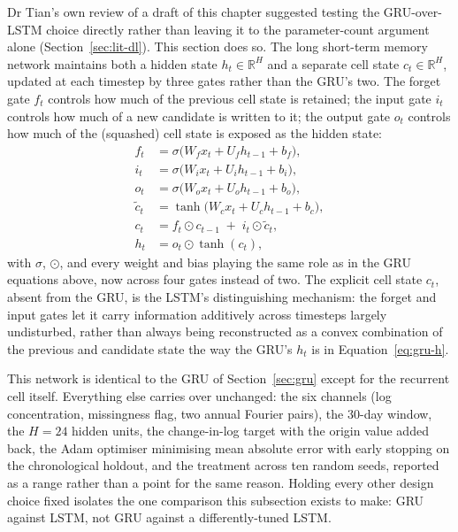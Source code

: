 \documentclass[12pt,a4paper]{report}
\begin{document}
Dr Tian's own review of a draft of this chapter suggested testing the
GRU-over-LSTM choice directly rather than leaving it to the parameter-count
argument alone (Section~\ref{sec:lit-dl}). This section does so. The long
short-term memory network \citep{hochreiter1997lstm} maintains both a
hidden state $h_t\in\mathbb{R}^H$ and a separate cell state
$c_t\in\mathbb{R}^H$, updated at each timestep by three gates rather than
the GRU's two. The forget gate $f_t$ controls how much of the previous
cell state is retained; the input gate $i_t$ controls how much of a new
candidate is written to it; the output gate $o_t$ controls how much of the
(squashed) cell state is exposed as the hidden state:
\begin{align}
f_t &= \sigma\big(W_f x_t + U_f h_{t-1} + b_f\big), \label{eq:lstm-f}\\
i_t &= \sigma\big(W_i x_t + U_i h_{t-1} + b_i\big), \label{eq:lstm-i}\\
o_t &= \sigma\big(W_o x_t + U_o h_{t-1} + b_o\big), \label{eq:lstm-o}\\
\tilde c_t &= \tanh\big(W_c x_t + U_c h_{t-1} + b_c\big), \label{eq:lstm-ctilde}\\
c_t &= f_t \odot c_{t-1} \;+\; i_t \odot \tilde c_t, \label{eq:lstm-c}\\
h_t &= o_t \odot \tanh(c_t), \label{eq:lstm-h}
\end{align}
with $\sigma$, $\odot$, and every weight and bias playing the same role as
in the GRU equations above, now across four gates instead of two. The
explicit cell state $c_t$, absent from the GRU, is the LSTM's distinguishing
mechanism: the forget and input gates let it carry information additively
across timesteps largely undisturbed, rather than always being
reconstructed as a convex combination of the previous and candidate state
the way the GRU's $h_t$ is in Equation~\ref{eq:gru-h}.

This network is identical to the GRU of Section~\ref{sec:gru} except for the
recurrent cell itself. Everything else carries over unchanged: the six
channels (log concentration, missingness flag, two annual Fourier pairs),
the 30-day window, the $H=24$ hidden units, the change-in-log target with
the origin value added back, the Adam optimiser minimising mean absolute
error with early stopping on the chronological holdout, and the treatment
across ten random seeds, reported as a range rather than a point for the
same reason. Holding every other design choice fixed isolates the one
comparison this subsection exists to make: GRU against LSTM, not GRU against
a differently-tuned LSTM.
\end{document}
